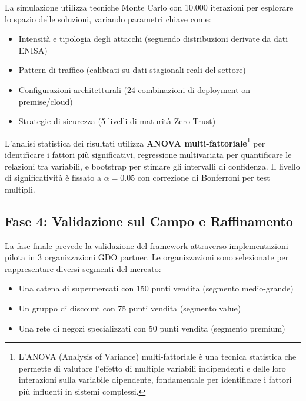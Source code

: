 La simulazione utilizza tecniche Monte Carlo con 10.000 iterazioni per esplorare lo spazio delle soluzioni, variando parametri chiave come:
\begin{itemize}
    \item Intensità e tipologia degli attacchi (seguendo distribuzioni derivate da dati ENISA)
    \item Pattern di traffico (calibrati su dati stagionali reali del settore)
    \item Configurazioni architetturali (24 combinazioni di deployment on-premise/cloud)
    \item Strategie di sicurezza (5 livelli di maturità Zero Trust)
\end{itemize}
L'analisi statistica dei risultati utilizza \textbf{ANOVA multi-fattoriale}\footnote{L'ANOVA (Analysis of Variance) multi-fattoriale è una tecnica statistica che permette di valutare l'effetto di multiple variabili indipendenti e delle loro interazioni sulla variabile dipendente, fondamentale per identificare i fattori più influenti in sistemi complessi.} per identificare i fattori più significativi, regressione multivariata per quantificare le relazioni tra variabili, e bootstrap per stimare gli intervalli di confidenza. Il livello di significatività è fissato a $\alpha = 0.05$ con correzione di Bonferroni per test multipli.

\subsection{Fase 4: Validazione sul Campo e Raffinamento}

La fase finale prevede la validazione del framework attraverso implementazioni pilota in 3 organizzazioni GDO partner. Le organizzazioni sono selezionate per rappresentare diversi segmenti del mercato:
\begin{itemize}
    \item Una catena di supermercati con 150 punti vendita (segmento medio-grande)
    \item Un gruppo di discount con 75 punti vendita (segmento value)
    \item Una rete di negozi specializzati con 50 punti vendita (segmento premium)
\end{itemize}

